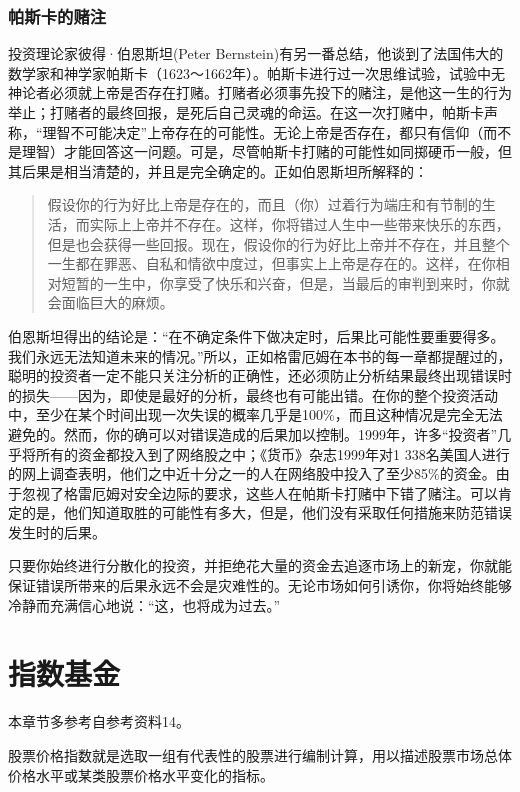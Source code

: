 \documentclass[12pt,oneside]{book}
\begin{document}
\subsection{帕斯卡的赌注}
投资理论家彼得·伯恩斯坦(Peter Bernstein)有另一番总结，他谈到了法国伟大的数学家和神学家帕斯卡（1623～1662年）。帕斯卡进行过一次思维试验，试验中无神论者必须就上帝是否存在打赌。打赌者必须事先投下的赌注，是他这一生的行为举止；打赌者的最终回报，是死后自己灵魂的命运。在这一次打赌中，帕斯卡声称，“理智不可能决定”上帝存在的可能性。无论上帝是否存在，都只有信仰（而不是理智）才能回答这一问题。可是，尽管帕斯卡打赌的可能性如同掷硬币一般，但其后果是相当清楚的，并且是完全确定的。正如伯恩斯坦所解释的：

\begin{quote}
假设你的行为好比上帝是存在的，而且（你）过着行为端庄和有节制的生活，而实际上上帝并不存在。这样，你将错过人生中一些带来快乐的东西，但是也会获得一些回报。现在，假设你的行为好比上帝并不存在，并且整个一生都在罪恶、自私和情欲中度过，但事实上上帝是存在的。这样，在你相对短暂的一生中，你享受了快乐和兴奋，但是，当最后的审判到来时，你就会面临巨大的麻烦。
\end{quote}

伯恩斯坦得出的结论是：“在不确定条件下做决定时，后果比可能性要重要得多。我们永远无法知道未来的情况。”所以，正如格雷厄姆在本书的每一章都提醒过的，聪明的投资者一定不能只关注分析的正确性，还必须防止分析结果最终出现错误时的损失——因为，即使是最好的分析，最终也有可能出错。在你的整个投资活动中，至少在某个时间出现一次失误的概率几乎是100\%，而且这种情况是完全无法避免的。然而，你的确可以对错误造成的后果加以控制。1999年，许多“投资者”几乎将所有的资金都投入到了网络股之中；《货币》杂志1999年对1 338名美国人进行的网上调查表明，他们之中近十分之一的人在网络股中投入了至少85\%的资金。由于忽视了格雷厄姆对安全边际的要求，这些人在帕斯卡打赌中下错了赌注。可以肯定的是，他们知道取胜的可能性有多大，但是，他们没有采取任何措施来防范错误发生时的后果。

只要你始终进行分散化的投资，并拒绝花大量的资金去追逐市场上的新宠，你就能保证错误所带来的后果永远不会是灾难性的。无论市场如何引诱你，你将始终能够冷静而充满信心地说：“这，也将成为过去。”







\chapter{指数基金}
本章节多参考自参考资料14。

股票价格指数就是选取一组有代表性的股票进行编制计算，用以描述股票市场总体价格水平或某类股票价格水平变化的指标。
\end{document}
